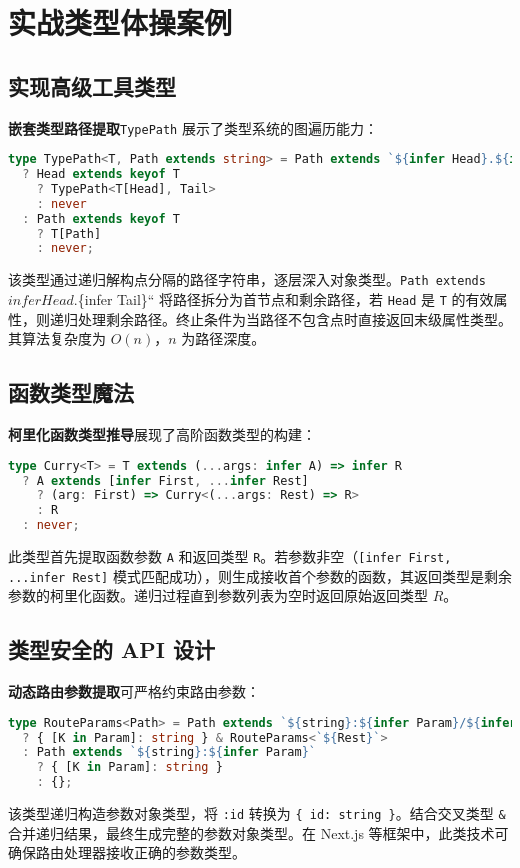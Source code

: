 \chapter{实战类型体操案例}
\section{实现高级工具类型}
\textbf{嵌套类型路径提取}\texttt{TypePath} 展示了类型系统的图遍历能力：\par
\begin{lstlisting}[language=typescript]
type TypePath<T, Path extends string> = Path extends `${infer Head}.${infer Tail}`
  ? Head extends keyof T
    ? TypePath<T[Head], Tail>
    : never
  : Path extends keyof T
    ? T[Path]
    : never;
\end{lstlisting}
该类型通过递归解构点分隔的路径字符串，逐层深入对象类型。\texttt{Path extends }${infer Head}.$\{{}infer Tail\}{}`` 将路径拆分为首节点和剩余路径，若 \texttt{Head} 是 \texttt{T} 的有效属性，则递归处理剩余路径。终止条件为当路径不包含点时直接返回末级属性类型。其算法复杂度为 $O(n)$，$n$ 为路径深度。\par
\section{函数类型魔法}
\textbf{柯里化函数类型推导}展现了高阶函数类型的构建：\par
\begin{lstlisting}[language=typescript]
type Curry<T> = T extends (...args: infer A) => infer R
  ? A extends [infer First, ...infer Rest]
    ? (arg: First) => Curry<(...args: Rest) => R>
    : R
  : never;
\end{lstlisting}
此类型首先提取函数参数 \texttt{A} 和返回类型 \texttt{R}。若参数非空（\texttt{[infer First, ...infer Rest]} 模式匹配成功），则生成接收首个参数的函数，其返回类型是剩余参数的柯里化函数。递归过程直到参数列表为空时返回原始返回类型 $R$。\par
\section{类型安全的 API 设计}
\textbf{动态路由参数提取}可严格约束路由参数：\par
\begin{lstlisting}[language=typescript]
type RouteParams<Path> = Path extends `${string}:${infer Param}/${infer Rest}`
  ? { [K in Param]: string } & RouteParams<`${Rest}`>
  : Path extends `${string}:${infer Param}`
    ? { [K in Param]: string }
    : {};
\end{lstlisting}
该类型递归构造参数对象类型，将 \texttt{:id} 转换为 \texttt{\{{} id: string \}{}}。结合交叉类型 \texttt{\&{}} 合并递归结果，最终生成完整的参数对象类型。在 Next.js 等框架中，此类技术可确保路由处理器接收正确的参数类型。\par
